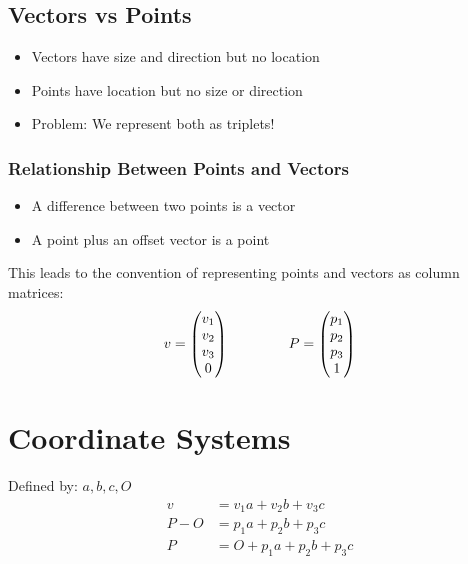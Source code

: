 \documentclass{article}
\begin{document}
\subsection*{Vectors vs Points}
\begin{itemize}
    \item Vectors have size and direction but no location
    \item Points have location but no size or direction
    \item Problem: We represent both as triplets!
\end{itemize}
\subsubsection*{Relationship Between Points and Vectors}
\begin{itemize}
    \item A difference between two points is a vector
    \item A point plus an offset vector is a point
\end{itemize}
This leads to the convention of representing points and vectors as column matrices:
\begin{align*}
    v = \begin{pmatrix} v_1 \\ v_2 \\ v_3 \\ 0\end{pmatrix}
    \hspace{1.5cm}
    P = \begin{pmatrix} p_1 \\ p_2 \\ p_3 \\ 1\end{pmatrix}
\end{align*}

\section*{Coordinate Systems}
Defined by: $a, b, c, O$
\begin{align*}
    v &= v_1 a + v_2 b + v_3 c \\
    P - O &= p_1 a + p_2 b + p_3 c \\
    P &= O + p_1 a + p_2 b + p_3 c
\end{align*}
\end{document}
